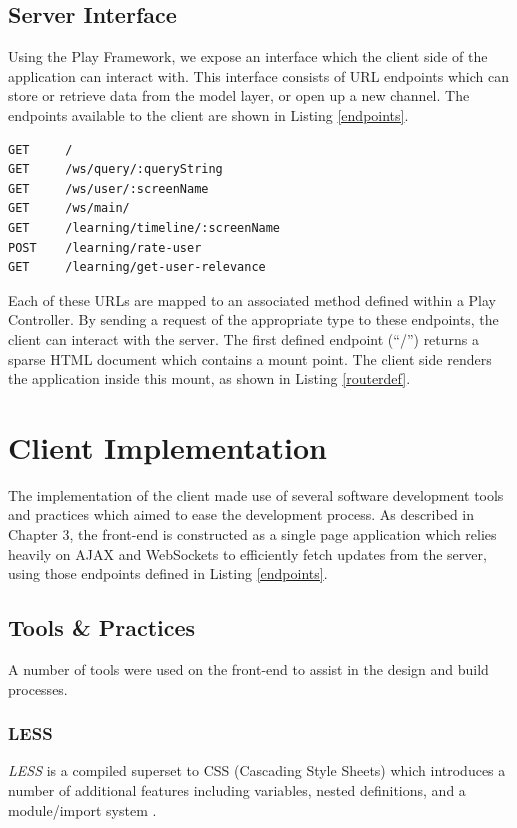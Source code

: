\documentclass{l4proj}
\begin{document}
    \subsection{Server Interface}
    Using the Play Framework, we expose an interface which the client side of the application can interact with. This interface consists of URL endpoints which can store or retrieve data from the model layer, or open up a new channel. The endpoints available to the client are shown in Listing \ref{endpoints}.
    
\begin{lstlisting}[label=endpoints,caption=The exposed interface of the server.]
GET     /
GET     /ws/query/:queryString                      
GET     /ws/user/:screenName                        
GET     /ws/main/                      
GET     /learning/timeline/:screenName              
POST    /learning/rate-user                         
GET     /learning/get-user-relevance                
\end{lstlisting}

Each of these URLs are mapped to an associated method defined within a Play Controller. By sending a request of the appropriate type to these endpoints, the client can interact with the server. The first defined endpoint (``/'') returns a sparse HTML document which contains a mount point. The client side renders the application inside this mount, as shown in Listing \ref{routerdef}.

                          
\section{Client Implementation}
The implementation of the client made use of several software development tools and practices which aimed to ease the development process. As described in Chapter 3, the front-end is constructed as a single page application which relies heavily on AJAX and WebSockets to efficiently fetch updates from the server, using those endpoints defined in Listing \ref{endpoints}.

        \subsection{Tools \& Practices}
        A number of tools were used on the front-end to assist in the design and build processes.
           
        \subsubsection{LESS}
        \textit{LESS} is a compiled superset to CSS (Cascading Style Sheets) which introduces a number of additional features including variables, nested definitions, and a module/import system \cite{less}.
        
\end{document}
